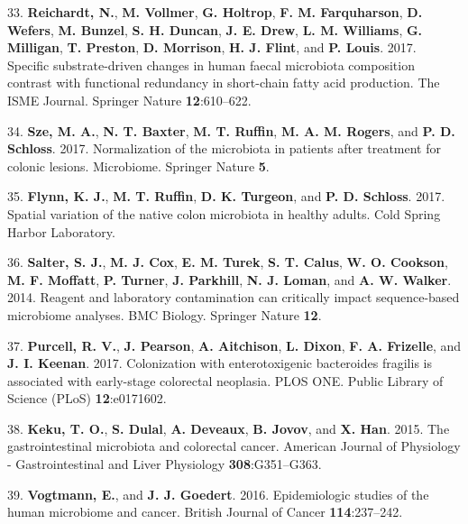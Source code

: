 \documentclass[12pt,]{article}
\begin{document}
\hypertarget{ref-Reichardt2017}{}
33. \textbf{Reichardt, N.}, \textbf{M. Vollmer}, \textbf{G. Holtrop},
\textbf{F. M. Farquharson}, \textbf{D. Wefers}, \textbf{M. Bunzel},
\textbf{S. H. Duncan}, \textbf{J. E. Drew}, \textbf{L. M. Williams},
\textbf{G. Milligan}, \textbf{T. Preston}, \textbf{D. Morrison},
\textbf{H. J. Flint}, and \textbf{P. Louis}. 2017. Specific
substrate-driven changes in human faecal microbiota composition contrast
with functional redundancy in short-chain fatty acid production. The
ISME Journal. Springer Nature \textbf{12}:610--622.

\hypertarget{ref-Sze2017}{}
34. \textbf{Sze, M. A.}, \textbf{N. T. Baxter}, \textbf{M. T. Ruffin},
\textbf{M. A. M. Rogers}, and \textbf{P. D. Schloss}. 2017.
Normalization of the microbiota in patients after treatment for colonic
lesions. Microbiome. Springer Nature \textbf{5}.

\hypertarget{ref-Flynn_preprint_2017}{}
35. \textbf{Flynn, K. J.}, \textbf{M. T. Ruffin}, \textbf{D. K.
Turgeon}, and \textbf{P. D. Schloss}. 2017. Spatial variation of the
native colon microbiota in healthy adults. Cold Spring Harbor
Laboratory.

\hypertarget{ref-Salter_contamination_2014}{}
36. \textbf{Salter, S. J.}, \textbf{M. J. Cox}, \textbf{E. M. Turek},
\textbf{S. T. Calus}, \textbf{W. O. Cookson}, \textbf{M. F. Moffatt},
\textbf{P. Turner}, \textbf{J. Parkhill}, \textbf{N. J. Loman}, and
\textbf{A. W. Walker}. 2014. Reagent and laboratory contamination can
critically impact sequence-based microbiome analyses. BMC Biology.
Springer Nature \textbf{12}.

\hypertarget{ref-Purcell2017}{}
37. \textbf{Purcell, R. V.}, \textbf{J. Pearson}, \textbf{A. Aitchison},
\textbf{L. Dixon}, \textbf{F. A. Frizelle}, and \textbf{J. I. Keenan}.
2017. Colonization with enterotoxigenic bacteroides fragilis is
associated with early-stage colorectal neoplasia. PLOS ONE. Public
Library of Science (PLoS) \textbf{12}:e0171602.

\hypertarget{ref-keku_gastrointestinal_2015}{}
38. \textbf{Keku, T. O.}, \textbf{S. Dulal}, \textbf{A. Deveaux},
\textbf{B. Jovov}, and \textbf{X. Han}. 2015. The gastrointestinal
microbiota and colorectal cancer. American Journal of Physiology -
Gastrointestinal and Liver Physiology \textbf{308}:G351--G363.

\hypertarget{ref-vogtmann_epidemiologic_2016}{}
39. \textbf{Vogtmann, E.}, and \textbf{J. J. Goedert}. 2016.
Epidemiologic studies of the human microbiome and cancer. British
Journal of Cancer \textbf{114}:237--242.
\end{document}
